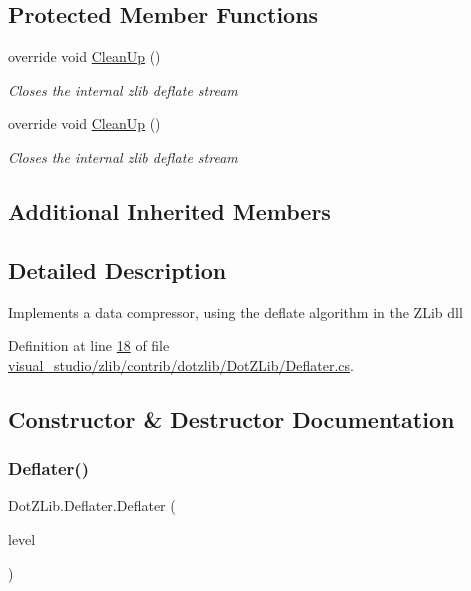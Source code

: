 \subsection*{Protected Member Functions}
\begin{DoxyCompactItemize}
\item 
override void \hyperlink{class_dot_z_lib_1_1_deflater_af06ac29d92dbe5d6198b8fa906476e05}{Clean\+Up} ()
\begin{DoxyCompactList}\small\item\em Closes the internal zlib deflate stream \end{DoxyCompactList}\item 
override void \hyperlink{class_dot_z_lib_1_1_deflater_af06ac29d92dbe5d6198b8fa906476e05}{Clean\+Up} ()
\begin{DoxyCompactList}\small\item\em Closes the internal zlib deflate stream \end{DoxyCompactList}\end{DoxyCompactItemize}
\subsection*{Additional Inherited Members}


\subsection{Detailed Description}
Implements a data compressor, using the deflate algorithm in the Z\+Lib dll 



Definition at line \hyperlink{visual__studio_2zlib_2contrib_2dotzlib_2_dot_z_lib_2_deflater_8cs_source_l00018}{18} of file \hyperlink{visual__studio_2zlib_2contrib_2dotzlib_2_dot_z_lib_2_deflater_8cs_source}{visual\+\_\+studio/zlib/contrib/dotzlib/\+Dot\+Z\+Lib/\+Deflater.\+cs}.



\subsection{Constructor \& Destructor Documentation}
\mbox{\label{class_dot_z_lib_1_1_deflater_a3af92869710011e866633c2186c7cab1}} 
\subsubsection{\texorpdfstring{Deflater()}{Deflater()}\hspace{0.1cm}{\footnotesize\ttfamily [1/2]}}
{\footnotesize\ttfamily Dot\+Z\+Lib.\+Deflater.\+Deflater (\begin{DoxyParamCaption}\item[{\hyperlink{namespace_dot_z_lib_a034f7a1ef9856d8834e6f6b1c53d8a4c}{Compress\+Level}}]{level }\end{DoxyParamCaption})\hspace{0.3cm}{\ttfamily [inline]}}



